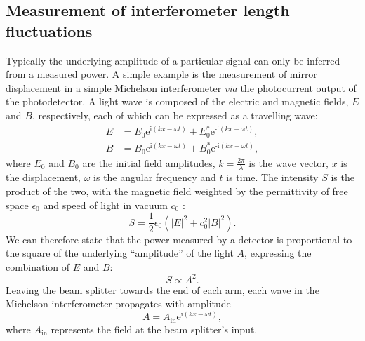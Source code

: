 \subsection{Measurement of interferometer length fluctuations}
Typically the underlying amplitude of a particular signal can only be inferred from a measured power. A simple example is the measurement of mirror displacement in a simple Michelson interferometer \emph{via} the photocurrent output of the photodetector. A light wave is composed of the electric and magnetic fields, $E$ and $B$, respectively, each of which can be expressed as a travelling wave:
\begin{align}
  E &= E_0 \text{e}^{\text{i} \left( kx - \omega t \right)} + E_0^{\ast} \text{e}^{\text{-i} \left( kx - \omega t \right)}, \\
  B &= B_0 \text{e}^{\text{i} \left( kx - \omega t \right)} + B_0^{\ast} \text{e}^{\text{-i} \left( kx - \omega t \right)},
\end{align}
where $E_0$ and $B_0$ are the initial field amplitudes, $k = \frac{2 \pi}{\lambda}$ is the wave vector, $x$ is the displacement, $\omega$ is the angular frequency and $t$ is time. The intensity $S$ is the product of the two, with the magnetic field weighted by the permittivity of free space $\epsilon_0$ and speed of light in vacuum $c_0$ :
\begin{equation}
  S = \frac{1}{2} \epsilon_0 \left( \left| E \right| ^2 + c_0^2 \left| B \right|^2 \right).
\end{equation}
We can therefore state that the power measured by a detector is proportional to the square of the underlying ``amplitude'' of the light $A$, expressing the combination of $E$ and $B$:
\begin{equation}
  S \propto A^2.
\end{equation}
Leaving the beam splitter towards the end of each arm, each wave in the Michelson interferometer propagates with amplitude
\begin{equation}
  A = A_{\text{in}} \text{e}^{\text{i} \left( kx - \omega t \right)},
\end{equation}
where $A_{\text{in}}$ represents the field at the beam splitter's input.

